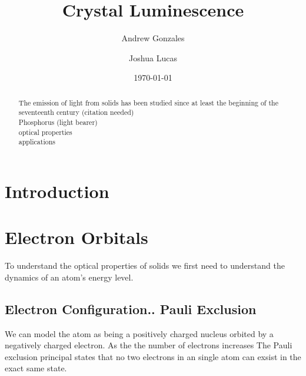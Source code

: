 \documentclass[prl,onecolumn]{revtex4-1}  %
\begin{document}

\title{Crystal Luminescence }

\author{Andrew Gonzales}

\author{Joshua Lucas}


\date{\today}

\begin{abstract}
The emission of light from solids has been studied since at least the beginning of the seventeenth century (citation needed) 
\\Phosphorus (light bearer)  
\\optical properties
\\applications


\end{abstract}

\maketitle %


\section{Introduction} %

\section{Electron Orbitals}
To understand the optical properties of solids we first need to understand the dynamics of an atom's  energy level. 
\subsection*{Electron Configuration.. Pauli Exclusion}
We can model the atom as being a positively charged nucleus orbited by a negatively charged electron. As the the number of electrons increases   The Pauli exclusion principal states that no two electrons in an single atom can exsist in the exact same state.  
\end{document}
